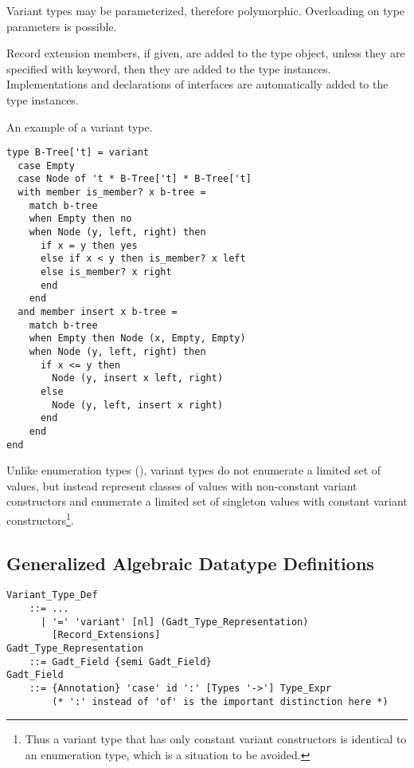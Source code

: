 Variant types may be parameterized, therefore polymorphic. Overloading on type parameters is possible. 

Record extension members, if given, are added to the type object, unless they are specified with  keyword, then they are added to the type instances. Implementations and declarations of interfaces are automatically added to the type instances. 

\example An example of a variant type. 
\begin{lstlisting}
type B-Tree['t] = variant 
  case Empty
  case Node of 't * B-Tree['t] * B-Tree['t]
  with member is_member? x b-tree =
    match b-tree
    when Empty then no
    when Node (y, left, right) then
      if x = y then yes
      else if x < y then is_member? x left
      else is_member? x right
      end 
    end 
  and member insert x b-tree = 
    match b-tree
    when Empty then Node (x, Empty, Empty)
    when Node (y, left, right) then
      if x <= y then 
        Node (y, insert x left, right)
      else 
        Node (y, left, insert x right)
      end
    end
end
\end{lstlisting}

Unlike enumeration types (), variant types do not enumerate a limited set of values, but instead represent classes of values with non-constant variant constructors and enumerate a limited set of singleton values with constant variant constructors\footnote{Thus a variant type that has only constant variant constructors is identical to an enumeration type, which is a situation to be avoided.}. 





\subsection{Generalized Algebraic Datatype Definitions}
\label{sec:gadt-types}

\grammar\begin{lstlisting}
Variant_Type_Def 
    ::= ...
      | '=' 'variant' [nl] (Gadt_Type_Representation) 
        [Record_Extensions]
Gadt_Type_Representation 
    ::= Gadt_Field {semi Gadt_Field}
Gadt_Field 
    ::= {Annotation} 'case' id ':' [Types '->'] Type_Expr
        (* ':' instead of 'of' is the important distinction here *)
\end{lstlisting}







